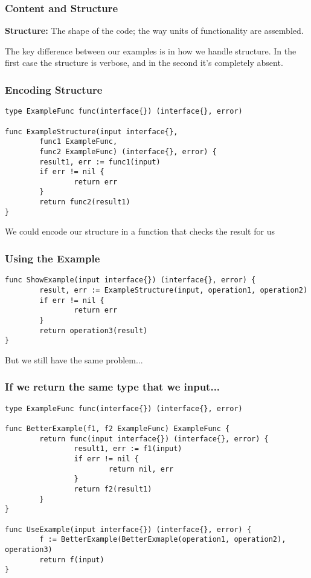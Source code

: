 \documentclass{beamer}
\begin{document}
\begin{frame}
  \frametitle{Content and Structure}
  {\bf Structure:} The shape of the code; the way units of functionality are assembled.

  \vfill

  The key difference between our examples is in how we handle
  structure.  In the first case the structure is verbose, and in the
  second it's completely absent.

  \vfill
\end{frame}

\begin{frame}[fragile]
  \frametitle{Encoding Structure}
\begin{lstlisting}
type ExampleFunc func(interface{}) (interface{}, error)

func ExampleStructure(input interface{},
        func1 ExampleFunc,
        func2 ExampleFunc) (interface{}, error) {
        result1, err := func1(input)
        if err != nil {
                return err
        }
        return func2(result1)
}
\end{lstlisting}
  \vfill
  We could encode our structure in a function that checks the result for us
\end{frame}

\begin{frame}[fragile]
  \frametitle{Using the Example}
\begin{lstlisting}
func ShowExample(input interface{}) (interface{}, error) {
        result, err := ExampleStructure(input, operation1, operation2)
        if err != nil {
                return err
        }
        return operation3(result)
}
\end{lstlisting}
  \vfill
  But we still have the same problem...
\end{frame}

\begin{frame}[fragile]
  \frametitle{If we return the same type that we input...}
\begin{lstlisting}
type ExampleFunc func(interface{}) (interface{}, error)

func BetterExample(f1, f2 ExampleFunc) ExampleFunc {
        return func(input interface{}) (interface{}, error) {
                result1, err := f1(input)
                if err != nil {
                        return nil, err
                }
                return f2(result1)
        }
}

func UseExample(input interface{}) (interface{}, error) {
        f := BetterExample(BetterExmaple(operation1, operation2), operation3)
        return f(input)
}
\end{lstlisting}
\end{frame}
\end{document}
